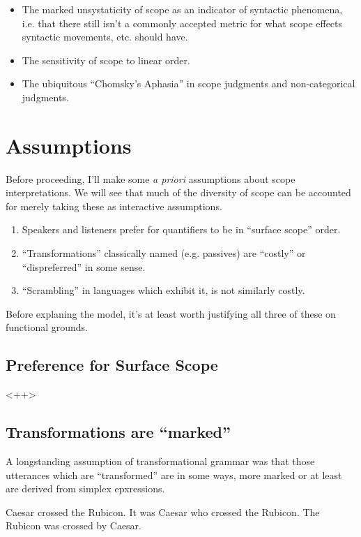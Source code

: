\documentclass{article}
\begin{document}
\begin{itemize}
	\item The marked unsystaticity of scope as an indicator of syntactic phenomena, i.e. that there still isn't a commonly accepted metric for what scope effects syntactic movements, etc. should have.
	\item The sensitivity of scope to linear order.
	\item The ubiquitous ``Chomsky's Aphasia'' in scope judgments and non-categorical judgments.
\end{itemize}

\section{Assumptions}


Before proceeding, I'll make some \emph{a priori} assumptions about scope interpretations.
We will see that much of the diversity of scope can be accounted for merely taking these as interactive assumptions.

\begin{enumerate}
\item Speakers and listeners prefer for quantifiers to be in ``surface scope'' order.
\item ``Transformations'' classically named (e.g. passives) are ``costly'' or ``dispreferred'' in some sense.
\item ``Scrambling'' in languages which exhibit it, is not similarly costly.
\end{enumerate}

Before explaning the model, it's at least worth justifying all three of these on functional grounds.

\subsection{Preference for Surface Scope}

<++>

\subsection{Transformations are ``marked''}

A longstanding assumption of transformational grammar was that those utterances which are ``transformed'' are in some ways, more marked or at least are derived from simplex epxressions.

\begin{exe}
	\ex\label{caes}
	\begin{xlist}
	\ex Caesar crossed the Rubicon.\label{simp}
	\ex It was Caesar who crossed the Rubicon.\label{celft}
	\ex The Rubicon was crossed by Caesar.\label{pass}
	\end{xlist}
\end{exe}
\end{document}
